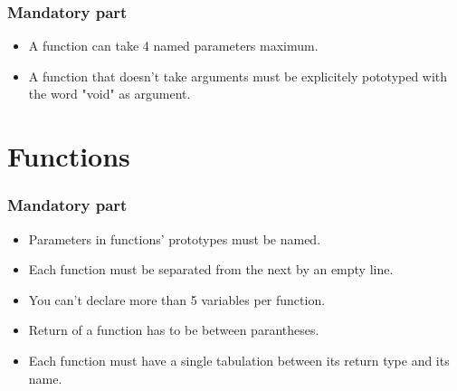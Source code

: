 \documentclass{42-en}
\begin{document}
        \subsubsection{Mandatory part}

            \begin{itemize}

    			\item A function can take 4 named parameters maximum.

			    \item A function that doesn't take arguments must be
                  explicitely pototyped with the word "void" as
                  argument.

            \end{itemize}


    \section{Functions}

        \subsubsection{Mandatory part}

            \begin{itemize}

          		\item Parameters in functions' prototypes must be named.

      			\item Each function must be separated from the next by
                 an empty line.

                \item You can't declare more than 5 variables per function.

                \item Return of a function has to be between parantheses. 

                \item Each function must have a single tabulation between its
                    return type and its name.

             \end{itemize}
\end{document}
